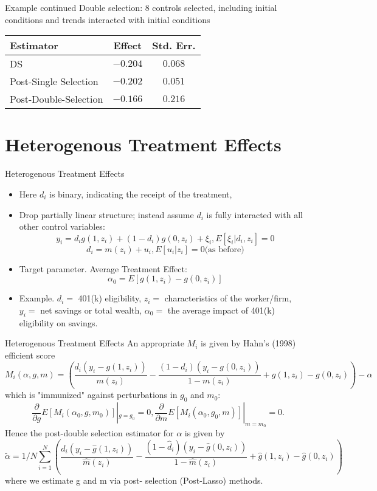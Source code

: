 \documentclass{beamer}
\begin{document}
\begin{frame}{Example continued}
Double selection: 8 controls selected, including initial conditions
and trends interacted with initial conditions

\begin{tabular}{lcc}
\hline \hline
Estimator &Effect& Std. Err.\\ \hline
DS &$-0.204$& $0.068$\\ \hline
Post-Single Selection& $- 0.202$& $0.051$\\ \hline
Post-Double-Selection& $-0.166$ &$0.216$\\ \hline \hline
\end{tabular}
\end{frame}

\section{Heterogenous Treatment Effects}

\begin{frame}{Heterogenous Treatment Effects}
\small
\begin{itemize}
\item Here $d_i$ is binary, indicating the receipt of the treatment,
\item Drop partially linear structure; instead assume $d_i$ is fully
interacted with all other control variables:
\[ y_i = d_i g(1, z_i) + (1 - d_i )g(0, z_i ) + \xi_i,  E[\xi_i| d_i, z_i ] = 0 \]
\[ d_i = m(z_i) + u_i, E[u_i| z_i] = 0  \text{(as before)} \]
\item Target parameter. Average Treatment Effect:
\[ \alpha_0 = E[g(1, z_i) - g(0, z_i)] \]
\item Example. $d_i=$ 401(k) eligibility, $z_i=$ characteristics of the
worker/firm, $y_i=$ net savings or total wealth, $\alpha_0 =$ the average
impact of 401(k) eligibility on savings.
\end{itemize}
\end{frame}

\begin{frame}{Heterogenous Treatment Effects}
\small
	An appropriate $M_i$ is given by Hahn's (1998) efficient score
\[ M_i(\alpha, g, m) = \left( \frac{d_i(y_i-g(1,z_i))}{m(z_i)} - \frac{(1-d_i)(y_i-g(0,z_i))}{1-m(z_i)}+ g(1,z_i) - g(0,z_i) \right) - \alpha \]
which is "immunized" against perturbations in $g_0$ and $m_0$:
\[ \frac{\partial}{\partial g} E[M_i (\alpha_0, g, m_0)]|_{g=g_0} = 0, 
\frac{\partial}{\partial m} E[M_i (\alpha_0, g_0, m)]|_{m=m_0} = 0. \]
Hence the post-double selection estimator for $\alpha$ is given by
\[ \tilde{\alpha} = 1/N \sum_{i=1}^N \left( \frac{d_i(y_i-\hat{g}(1,z_i))}{\hat{m}(z_i)} - \frac{(1-\hat{d}_i)(y_i-\hat{g}(0,z_i))}{1-\hat{m}(z_i)}+ \hat{g}(1,z_i) - \hat{g}(0,z_i) \right)\]
where we estimate g and m via post- selection (Post-Lasso)
methods.
\end{frame}
\end{document}

